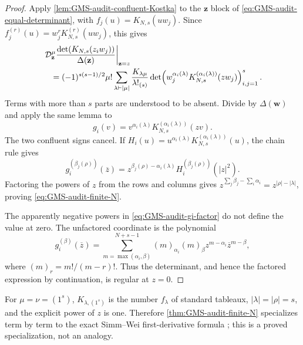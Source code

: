\begin{proof}
Apply \cref{lem:GMS-audit-confluent-Kostka} to the $\mathbf z$ block of
\eqref{eq:GMS-audit-equal-determinant}, with
$f_j(u)=K_{N,s}(uw_j)$.  Since
$f_j^{(r)}(u)=w_j^rK_{N,s}^{(r)}(uw_j)$, this gives
\begin{align}
 &\left.\mathcal D_{\mathbf z}^{\mu}
 \frac{\det(K_{N,s}(z_iw_j))}{\Delta(\mathbf z)}
 \right|_{\mathbf z=z}\notag\\
 &\quad=(-1)^{s(s-1)/2}\mu!
 \sum_{\lambda\vdash|\mu|}
 \frac{K_{\lambda\mu}}{\lambda!_{(s)}}
 \det\!\left(w_j^{\alpha_i(\lambda)}
 K_{N,s}^{(\alpha_i(\lambda))}(zw_j)\right)_{i,j=1}^{s}.
 \label{eq:GMS-audit-first-confluence}
\end{align}
Terms with more than $s$ parts are understood to be absent.  Divide by $\Delta(\mathbf w)$
and apply the same lemma to
\begin{equation}
 g_i(v)=v^{\alpha_i(\lambda)}K_{N,s}^{(\alpha_i(\lambda))}(zv).
 \label{eq:GMS-audit-gi}
\end{equation}
The two confluent signs cancel.  If
$H_i(u)=u^{\alpha_i(\lambda)}K_{N,s}^{(\alpha_i(\lambda))}(u)$, the chain rule gives
\begin{equation}
 g_i^{(\beta_j(\rho))}(\overline z)
 =z^{\beta_j(\rho)-\alpha_i(\lambda)}
 H_i^{(\beta_j(\rho))}(|z|^2).
 \label{eq:GMS-audit-gi-factor}
\end{equation}
Factoring the powers of $z$ from the rows and columns gives
$z^{\sum_j\beta_j-\sum_i\alpha_i}=z^{|\rho|-|\lambda|}$, proving
\eqref{eq:GMS-audit-finite-N}.

The apparently negative powers in \eqref{eq:GMS-audit-gi-factor} do not define the value at
zero.  The unfactored coordinate is the polynomial
\begin{equation}
 g_i^{(\beta)}(\overline z)
 =\sum_{m=\max(\alpha_i,\beta)}^{N+s-1}
 (m)_{\alpha_i}(m)_{\beta}
 z^{m-\alpha_i}\overline z^{m-\beta},
 \label{eq:GMS-audit-zero-regularity}
\end{equation}
where $(m)_r=m!/(m-r)!$.  Thus the determinant, and hence the factored expression by
continuation, is regular at $z=0$.
\end{proof}

For $\mu=\nu=(1^s)$, $K_{\lambda,(1^s)}$ is the number $f_\lambda$ of standard tableaux,
$|\lambda|=|\rho|=s$, and the explicit power of $z$ is one.  Therefore
\cref{thm:GMS-audit-finite-N} specializes term by term to the exact Simm--Wei first-derivative
formula \cite[Thm.~1.5]{simmWei2026}; this is a proved specialization, not an analogy.

